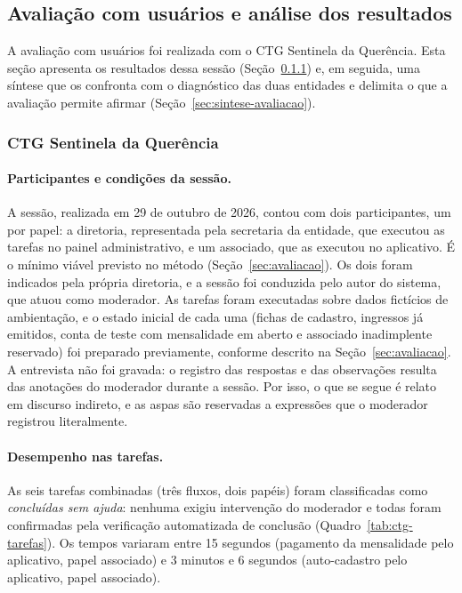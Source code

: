 \documentclass[12pt,a4paper]{article}
\begin{document}
\subsection{Avaliação com usuários e análise dos resultados}

A avaliação com usuários foi realizada com o CTG Sentinela da Querência. Esta seção apresenta os
resultados dessa sessão (Seção~\ref{sec:avaliacao-ctg}) e, em seguida, uma síntese que os confronta
com o diagnóstico das duas entidades e delimita o que a avaliação permite afirmar
(Seção~\ref{sec:sintese-avaliacao}).

\subsubsection{CTG Sentinela da Querência}
\label{sec:avaliacao-ctg}

\paragraph{Participantes e condições da sessão.} A sessão, realizada em 29 de outubro de 2026,
contou com dois participantes, um por papel: a diretoria, representada pela secretaria da entidade,
que executou as tarefas no painel administrativo, e um associado, que as executou no aplicativo. É o
mínimo viável previsto no método (Seção~\ref{sec:avaliacao}). Os dois foram indicados pela própria
diretoria, e a sessão foi conduzida pelo autor do sistema, que atuou como moderador. As tarefas
foram executadas sobre dados fictícios de ambientação, e o estado inicial de cada uma (fichas de
cadastro, ingressos já emitidos, conta de teste com mensalidade em aberto e associado inadimplente
reservado) foi preparado previamente, conforme descrito na Seção~\ref{sec:avaliacao}. A entrevista não
foi gravada: o registro das respostas e das observações resulta das anotações do moderador durante a
sessão. Por isso, o que se segue é relato em discurso indireto, e as aspas são reservadas a
expressões que o moderador registrou literalmente.

\paragraph{Desempenho nas tarefas.} As seis tarefas combinadas (três fluxos, dois papéis) foram
classificadas como \textit{concluídas sem ajuda}: nenhuma exigiu intervenção do moderador e todas
foram confirmadas pela verificação automatizada de conclusão (Quadro~\ref{tab:ctg-tarefas}). Os
tempos variaram entre 15 segundos (pagamento da mensalidade pelo aplicativo, papel associado) e
3 minutos e 6 segundos (auto-cadastro pelo aplicativo, papel associado).
\end{document}
